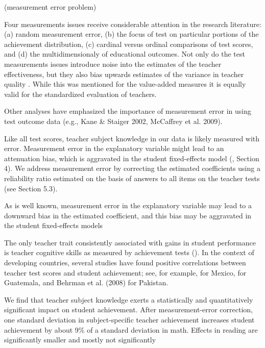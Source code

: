  (measurement error problem)


Four measurements issues receive considerable attention in the research literature: (a) random measurement error, (b) the focus of test on particular portions of the achievement distribution, (c) cardinal versus ordinal comparisons of test scores, and (d) the multidimensionaly of educational outcomes. Not only do the test measurements issues introduce noise into the estimates of the teacher effectiveness, but they also bias upwards estimates of the variance in teacher quality \citep{Hanushek_et_al_2012}. While this was mentioned for the value-added measures it is equally valid for the standardized evaluation of teachers.


Other analyses have emphasized the importance of measurement error in using test outcome data (e.g., Kane & Staiger 2002, McCaffrey et al. 2009).


Like all test scores, teacher subject knowledge in our data is likely measured with error. Measurement error in the explanatory variable might lead to an attenuation bias, which is aggravated in the student fixed-effects model (\citep{Angrist_et_al_1999}, Section 4). We address measurement error by correcting the estimated coefficients using a reliability ratio estimated on the basis of answers to all items on the teacher tests (see Section 5.3).


As is well known, measurement error in the explanatory variable may lead to a downward bias in the estimated coefficient, and this bias may be aggravated in the student fixed-effects models \citep{Angrist_et_al_1999}


The only teacher trait consistently associated with gains in student performance is teacher cognitive skills as measured by achievement tests (\citep{Hanushek_et_al_2006, Rockoff_et_al_2011}). In the context of developing countries, several studies have found positive correlations between teacher test scores and student achievement; see, for example, \citep{Santibanez_2006} for Mexico, \citep{Marshall_2009} for Guatemala, and Behrman et al. (2008) for Pakistan.


We find that teacher subject knowledge exerts a statistically and quantitatively significant impact on student achievement. After measurement-error correction, one standard deviation in subject-specific teacher achievement increases student achievement by about 9\% of a standard deviation in math. Effects in reading are significantly smaller and mostly not significantly \citep{Metzler_et_al_2012}


